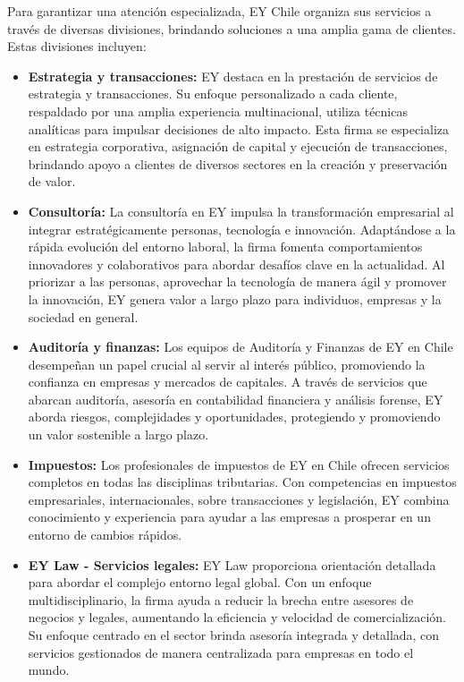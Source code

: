\documentclass{article}
\begin{document}
Para garantizar una atención especializada, EY Chile organiza sus servicios a través de diversas divisiones, brindando soluciones a una amplia gama de clientes. Estas divisiones incluyen:

\begin{itemize}

    \item \textbf{Estrategia y transacciones:} EY destaca en la prestación de servicios de estrategia y transacciones. Su enfoque personalizado a cada cliente, respaldado por una amplia experiencia multinacional, utiliza técnicas analíticas para impulsar decisiones de alto impacto. Esta firma se especializa en estrategia corporativa, asignación de capital y ejecución de transacciones, brindando apoyo a clientes de diversos sectores en la creación y preservación de valor. 

    \item \textbf{Consultoría:} La consultoría en EY impulsa la transformación empresarial al integrar estratégicamente personas, tecnología e innovación. Adaptándose a la rápida evolución del entorno laboral, la firma fomenta comportamientos innovadores y colaborativos para abordar desafíos clave en la actualidad. Al priorizar a las personas, aprovechar la tecnología de manera ágil y promover la innovación, EY genera valor a largo plazo para individuos, empresas y la sociedad en general.

    \item \textbf{Auditoría y finanzas:} Los equipos de Auditoría y Finanzas de EY en Chile desempeñan un papel crucial al servir al interés público, promoviendo la confianza en empresas y mercados de capitales. A través de servicios que abarcan auditoría, asesoría en contabilidad financiera y análisis forense, EY aborda riesgos, complejidades y oportunidades, protegiendo y promoviendo un valor sostenible a largo plazo.

    \item \textbf{Impuestos:} Los profesionales de impuestos de EY en Chile ofrecen servicios completos en todas las disciplinas tributarias. Con competencias en impuestos empresariales, internacionales, sobre transacciones y legislación, EY combina conocimiento y experiencia para ayudar a las empresas a prosperar en un entorno de cambios rápidos.

    \item \textbf{EY Law - Servicios legales:} EY Law proporciona orientación detallada para abordar el complejo entorno legal global. Con un enfoque multidisciplinario, la firma ayuda a reducir la brecha entre asesores de negocios y legales, aumentando la eficiencia y velocidad de comercialización. Su enfoque centrado en el sector brinda asesoría integrada y detallada, con servicios gestionados de manera centralizada para empresas en todo el mundo.
    
    \end{itemize}
\end{document}
